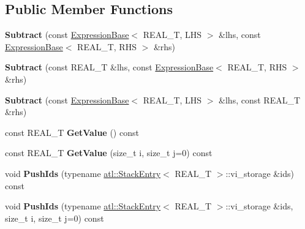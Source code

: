 \subsection*{Public Member Functions}
\begin{DoxyCompactItemize}
\item 
\hypertarget{structatl_1_1_subtract_a5aa723f31391e747b2e0ad15119534a7}{{\bfseries Subtract} (const \hyperlink{structatl_1_1_expression_base}{Expression\+Base}$<$ R\+E\+A\+L\+\_\+\+T, L\+H\+S $>$ \&lhs, const \hyperlink{structatl_1_1_expression_base}{Expression\+Base}$<$ R\+E\+A\+L\+\_\+\+T, R\+H\+S $>$ \&rhs)}\label{structatl_1_1_subtract_a5aa723f31391e747b2e0ad15119534a7}

\item 
\hypertarget{structatl_1_1_subtract_aec4aa20754729e6982fcf50cc8db62f0}{{\bfseries Subtract} (const R\+E\+A\+L\+\_\+\+T \&lhs, const \hyperlink{structatl_1_1_expression_base}{Expression\+Base}$<$ R\+E\+A\+L\+\_\+\+T, R\+H\+S $>$ \&rhs)}\label{structatl_1_1_subtract_aec4aa20754729e6982fcf50cc8db62f0}

\item 
\hypertarget{structatl_1_1_subtract_a62685c3f4f2009e2d8d5d456b6fadc99}{{\bfseries Subtract} (const \hyperlink{structatl_1_1_expression_base}{Expression\+Base}$<$ R\+E\+A\+L\+\_\+\+T, L\+H\+S $>$ \&lhs, const R\+E\+A\+L\+\_\+\+T \&rhs)}\label{structatl_1_1_subtract_a62685c3f4f2009e2d8d5d456b6fadc99}

\item 
\hypertarget{structatl_1_1_subtract_a80b7e3ae7a1459a1a64f226dbc6007db}{const R\+E\+A\+L\+\_\+\+T {\bfseries Get\+Value} () const }\label{structatl_1_1_subtract_a80b7e3ae7a1459a1a64f226dbc6007db}

\item 
\hypertarget{structatl_1_1_subtract_a88c1c9bc7979105b03e33e12e7c68fe1}{const R\+E\+A\+L\+\_\+\+T {\bfseries Get\+Value} (size\+\_\+t i, size\+\_\+t j=0) const }\label{structatl_1_1_subtract_a88c1c9bc7979105b03e33e12e7c68fe1}

\item 
\hypertarget{structatl_1_1_subtract_a975412a952c1ac7e416b240c1d26e1f7}{void {\bfseries Push\+Ids} (typename \hyperlink{structatl_1_1_stack_entry}{atl\+::\+Stack\+Entry}$<$ R\+E\+A\+L\+\_\+\+T $>$\+::vi\+\_\+storage \&ids) const }\label{structatl_1_1_subtract_a975412a952c1ac7e416b240c1d26e1f7}

\item 
\hypertarget{structatl_1_1_subtract_aa1e7d93e4b4a9bf0a1f60e9e214b3d3c}{void {\bfseries Push\+Ids} (typename \hyperlink{structatl_1_1_stack_entry}{atl\+::\+Stack\+Entry}$<$ R\+E\+A\+L\+\_\+\+T $>$\+::vi\+\_\+storage \&ids, size\+\_\+t i, size\+\_\+t j=0) const }\label{structatl_1_1_subtract_aa1e7d93e4b4a9bf0a1f60e9e214b3d3c}


\end{DoxyCompactItemize}
